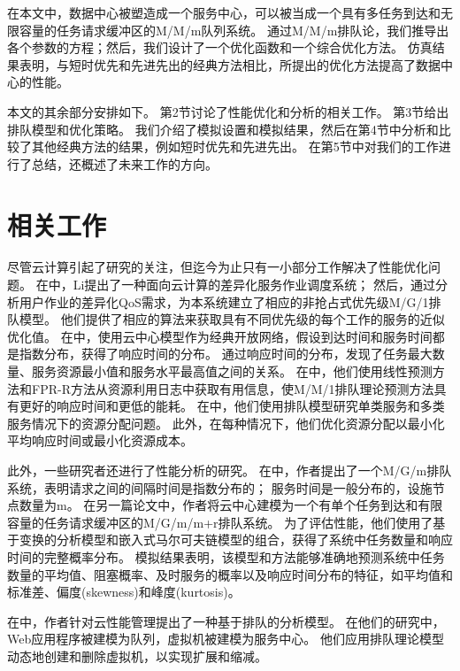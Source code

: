 \documentclass{morningstar}
\begin{document}
在本文中，数据中心被塑造成一个服务中心，可以被当成一个具有多任务到达和无限容量的任务请求缓冲区的M/M/m队列系统。 
通过M/M/m排队论，我们推导出各个参数的方程；然后，我们设计了一个优化函数和一个综合优化方法。
仿真结果表明，与短时优先和先进先出的经典方法相比，所提出的优化方法提高了数据中心的性能。
\par

本文的其余部分安排如下。
第2节讨论了性能优化和分析的相关工作。
第3节给出排队模型和优化策略。
我们介绍了模拟设置和模拟结果，然后在第4节中分析和比较了其他经典方法的结果，例如短时优先和先进先出。
在第5节中对我们的工作进行了总结，还概述了未来工作的方向。


\section{相关工作}
尽管云计算引起了研究的关注，但迄今为止只有一小部分工作解决了性能优化问题。
在\cite{key15}中，Li提出了一种面向云计算的差异化服务作业调度系统；
然后，通过分析用户作业的差异化QoS需求，为本系统建立了相应的非抢占式优先级M/G/1排队模型。
他们提供了相应的算法来获取具有不同优先级的每个工作的服务的近似优化值。
在\cite{key16}中，使用云中心模型作为经典开放网络，假设到达时间和服务时间都是指数分布，获得了响应时间的分布。
通过响应时间的分布，发现了任务最大数量、服务资源最小值和服务水平最高值之间的关系。
在\cite{key17}中，他们使用线性预测方法和FPR-R方法从资源利用日志中获取有用信息，使M/M/1排队理论预测方法具有更好的响应时间和更低的能耗。
在\cite{key18}中，他们使用排队模型研究单类服务和多类服务情况下的资源分配问题。
此外，在每种情况下，他们优化资源分配以最小化平均响应时间或最小化资源成本。
\par

此外，一些研究者还进行了性能分析的研究。
在\cite{key19}中，作者提出了一个M/G/m排队系统，表明请求之间的间隔时间是指数分布的；
服务时间是一般分布的，设施节点数量为m。
在另一篇论文\cite{key20}中，作者将云中心建模为一个有单个任务到达和有限容量的任务请求缓冲区的M/G/m/m+r排队系统。
为了评估性能，他们使用了基于变换的分析模型和嵌入式马尔可夫链模型的组合，获得了系统中任务数量和响应时间的完整概率分布。
模拟结果表明，该模型和方法能够准确地预测系统中任务数量的平均值、阻塞概率、及时服务的概率以及响应时间分布的特征，如平均值和标准差、偏度(skewness)和峰度(kurtosis)。
\par

在\cite{key21}中，作者针对云性能管理提出了一种基于排队的分析模型。
在他们的研究中，Web应用程序被建模为队列，虚拟机被建模为服务中心。
他们应用排队理论模型动态地创建和删除虚拟机，以实现扩展和缩减。
\par
\end{document}
